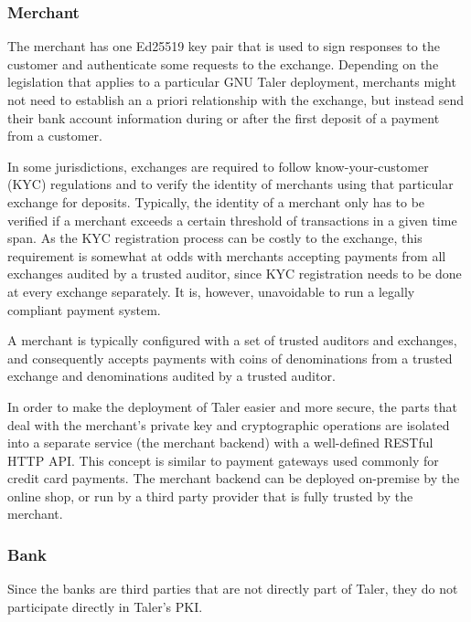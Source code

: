 \subsubsection{Merchant}
The merchant has one Ed25519 key pair that is used to sign responses to the
customer and authenticate some requests to the exchange.  Depending on the
legislation that applies to a particular GNU Taler deployment, merchants might
not need to establish an a priori relationship with the exchange, but instead
send their bank account information during or after the first deposit of a
payment from a customer.

In some jurisdictions, exchanges are required to follow know-your-customer
(KYC) regulations and to verify the identity of merchants \cite{arner2018identity} using that particular
exchange for deposits.  Typically, the identity of a merchant only has to be
verified if a merchant exceeds a certain threshold of transactions in a given
time span.  As the KYC registration process can be costly to the exchange, this
requirement is somewhat at odds with merchants accepting payments from all
exchanges audited by a trusted auditor, since KYC registration needs to be done
at every exchange separately.  It is, however, unavoidable to run a legally
compliant payment system.

A merchant is typically configured with a set of trusted auditors and
exchanges, and consequently accepts payments with coins of denominations from a
trusted exchange and denominations audited by a trusted auditor.

In order to make the deployment of Taler easier and more secure, the parts that
deal with the merchant's private key and cryptographic operations are isolated
into a separate service (the merchant backend) with a well-defined RESTful HTTP API.
This concept is similar to payment gateways used commonly for credit card
payments.  The merchant backend can be deployed on-premise by the online shop,
or run by a third party provider that is fully trusted by the merchant.

\subsubsection{Bank}
Since the banks are third parties that are not directly part of Taler, they do
not participate directly in Taler's PKI.

